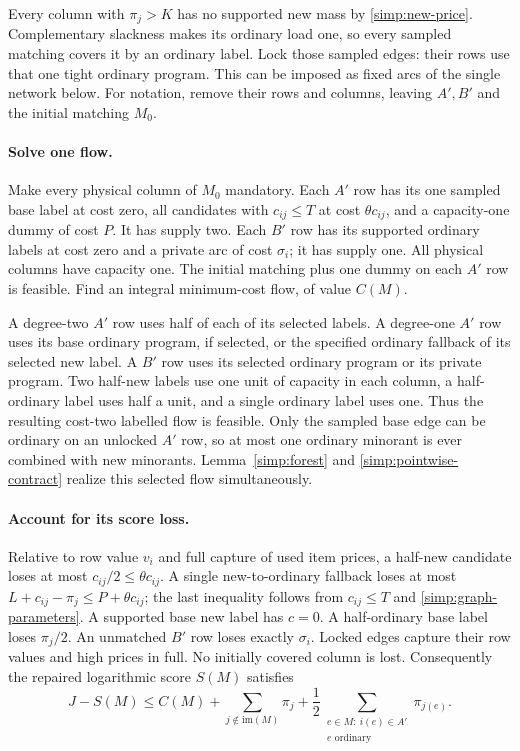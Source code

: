 Every column with $\pi_j>K$ has no supported new mass by
\eqref{simp:new-price}.  Complementary slackness makes its ordinary
load one, so every sampled matching covers it by an ordinary label.
Lock those sampled edges: their rows use that one tight ordinary
program.  This can be imposed as fixed arcs of the single network
below.  For notation, remove their rows and columns, leaving $A',B'$
and the initial matching $M_0$.

\paragraph{Solve one flow.}
Make every physical column of $M_0$ mandatory.  Each $A'$ row has
its one sampled base label at cost zero, all candidates with
$c_{ij}\le T$ at cost $\theta c_{ij}$, and a capacity-one dummy of
cost $P$.  It has supply two.  Each $B'$ row has its supported
ordinary labels at cost zero and a private arc of cost $\sigma_i$;
it has supply one.  All physical columns have capacity one.
The initial matching plus one dummy on each $A'$ row is feasible.
Find an integral minimum-cost flow, of value $C(M)$.

A degree-two $A'$ row uses half of each of its selected labels.
A degree-one $A'$ row uses its base ordinary program, if selected,
or the specified ordinary fallback of its selected new label.
A $B'$ row uses its selected ordinary program or its private program.
Two half-new labels use one unit of capacity in each column, a
half-ordinary label uses half a unit, and a single ordinary label
uses one.  Thus the resulting cost-two labelled flow is feasible.
Only the sampled base edge can be ordinary on an unlocked $A'$ row,
so at most one ordinary minorant is ever combined with new minorants.
Lemma~\ref{simp:forest} and \eqref{simp:pointwise-contract} realize
this selected flow simultaneously.

\paragraph{Account for its score loss.}
Relative to row value $v_i$ and full capture of used item prices,
a half-new candidate loses at most $c_{ij}/2\le\theta c_{ij}$.
A single new-to-ordinary fallback loses at most
$L+c_{ij}-\pi_j\le P+\theta c_{ij}$; the last inequality follows
from $c_{ij}\le T$ and \eqref{simp:graph-parameters}.
A supported base new label has $c=0$.
A half-ordinary base label loses $\pi_j/2$.
An unmatched $B'$ row loses exactly $\sigma_i$.
Locked edges capture their row values and high prices in full.
No initially covered column is lost.  Consequently the repaired
logarithmic score $S(M)$ satisfies
\begin{equation}\label{simp:conditional-loss}
 J-S(M)\le C(M)+
   \sum_{j\notin\mathrm{im}(M)}\pi_j
   +\frac12\sum_{\substack{e\in M:\ i(e)\in A'\\e\text{ ordinary}}}\pi_{j(e)}.
\end{equation}


